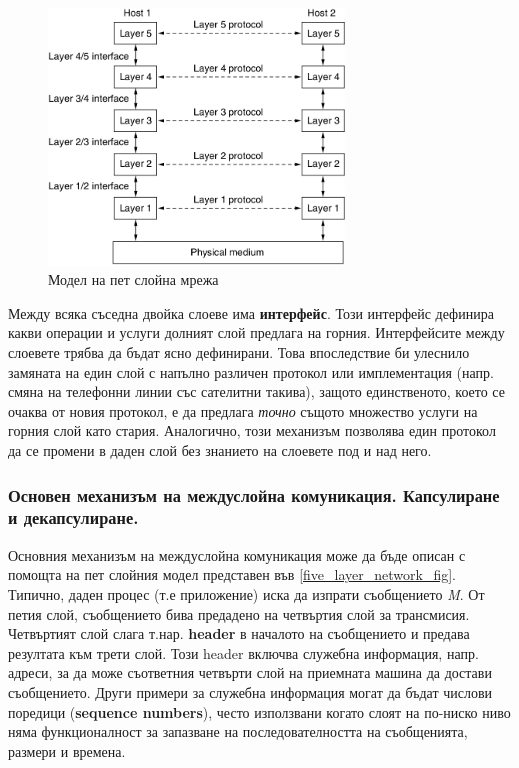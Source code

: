 \documentclass[12pt,a4paper,oneside]{book}
\begin{document}
\begin{figure}[h!]
  \centering
  \includegraphics[width=0.7\textwidth]{figures/five_layer_network.png}
  \caption{Модел на пет слойна мрежа}
  \label{five_layer_network_fig}
\end{figure}

Между всяка съседна двойка слоеве има \textbf{интерфейс}. Този интерфейс
дефинира какви операции и услуги долният слой предлага на горния. Интерфейсите
между слоевете трябва да бъдат ясно дефинирани. Това впоследствие би улеснило
замяната на един слой с напълно различен протокол или имплементация (напр.
смяна на телефонни линии със сателитни такива), защото единственото, което се
очаква от новия протокол, е да предлага \textit{точно} същото множество услуги
на горния слой като стария. Аналогично, този механизъм позволява един протокол
да се промени в даден слой без знанието на слоевете под и над него.

\subsubsection{Основен механизъм на междуслойна комуникация. Капсулиране и
декапсулиране.}

Основния механизъм на междуслойна комуникация може да бъде описан с помощта на
пет слойния модел представен във \autoref{five_layer_network_fig}. Типично,
даден процес (т.е приложение) иска да изпрати съобщението \textit{M}. От петия
слой, съобщението бива предадено на четвъртия слой за трансмисия. Четвъртият
слой слага т.нар. \textbf{header} в началото на съобщението и предава резултата
към трети слой. Този header включва служебна информация, напр. адреси, за да
може съответния четвърти слой на приемната машина да достави съобщението. Други
примери за служебна информация могат да бъдат числови поредици (\textbf{sequence
numbers}), често използвани когато слоят на по-ниско ниво няма функционалност за
запазване на последователността на съобщенията, размери и времена.
\end{document}
